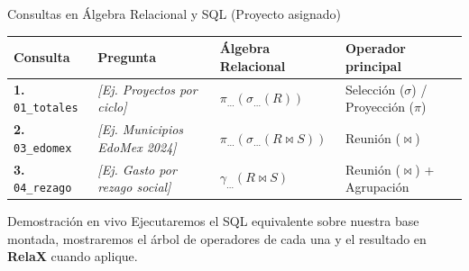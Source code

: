 \documentclass[aspectratio=169,11pt]{beamer}
\begin{document}
\begin{frame}{Consultas en Álgebra Relacional y SQL (Proyecto asignado)}
  \vspace{0.15cm}
  \footnotesize
  \begin{tabular}{p{2.2cm} p{3.3cm} p{3.8cm} p{2.7cm}}
    \toprule
    \textbf{\color{AzulClaro}Consulta} & \textbf{\color{AzulClaro}Pregunta} & \textbf{\color{AzulClaro}Álgebra Relacional} & \textbf{\color{AzulClaro}Operador principal} \\
    \midrule
    \textbf{1.} \texttt{01\_totales} & \textit{[Ej. Proyectos por ciclo]} & $\pi_{\dots}(\sigma_{\dots}(R))$ & Selección ($\sigma$) / Proyección ($\pi$) \\[0.35cm]
    \textbf{2.} \texttt{03\_edomex} & \textit{[Ej. Municipios EdoMex 2024]} & $\pi_{\dots}(\sigma_{\dots}(R \bowtie S))$ & Reunión ($\bowtie$) \\[0.35cm]
    \textbf{3.} \texttt{04\_rezago} & \textit{[Ej. Gasto por rezago social]} & $\gamma_{\dots}(R \bowtie S)$ & Reunión ($\bowtie$) + Agrupación \\
    \bottomrule
  \end{tabular}

  \vspace{0.5cm}
  \begin{exampleblock}{Demostración en vivo}
    Ejecutaremos el SQL equivalente sobre nuestra base montada, mostraremos el árbol de operadores de cada una y el resultado en \textbf{RelaX} cuando aplique.
  \end{exampleblock}
\end{frame}
\end{document}
